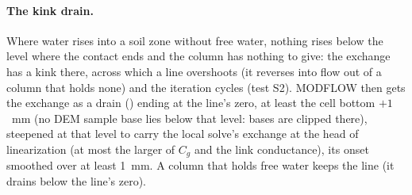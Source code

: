 \paragraph{The kink drain.} Where water rises into a soil zone without free water, nothing rises below the level where the
contact ends and the column has nothing to give: the exchange has a kink there, across which a line overshoots (it reverses
into flow out of a column that holds none) and the iteration cycles (test S2). MODFLOW then gets the exchange as a drain
() ending at the line's zero, at least the cell bottom $+1$~mm (no DEM sample base lies below that level:
bases are clipped there), steepened at that level to carry the local solve's exchange at the head of linearization (at most
the larger of $C_g$ and the link conductance), its onset smoothed over at least 1~mm. A column that holds free water keeps
the line (it drains below the line's zero).

